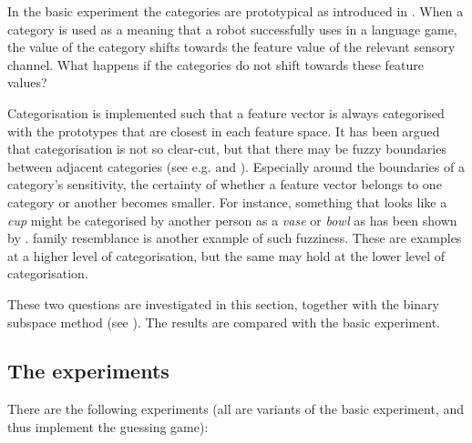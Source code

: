 In the basic experiment the categories are prototypical as introduced in . When a category is used as a meaning that a robot successfully uses in a language game, the value of the category shifts towards the feature value of the relevant sensory channel. What happens if the categories do not shift towards these feature values?

Categorisation is implemented such that a feature vector is always categorised with the prototypes that are closest in each feature space. It has been argued that categorisation is not so clear-cut, but that there may be fuzzy boundaries between adjacent categories (see e.g. \citealt{aitchison:1987} and \citealt{lakoff:1987}). Especially around the boundaries of a category's sensitivity, the certainty of whether a feature vector belongs to one category or another becomes smaller. For instance, something that looks like a {\em cup} might be categorised by another person as a {\em vase} or {\em bowl} as has been shown by \citet{labov:1973}. {\sc family resemblance} \citep{wittgenstein:1958} is another example of such fuzziness.  These are examples at a higher level of categorisation, but the same may hold at the lower level of categorisation.

These two questions are investigated in this section, together with the binary subspace method (see ). The results are compared with the basic experiment.

\subsection{The experiments}

There are the following experiments (all are variants of the basic experiment, and thus implement the guessing game):

